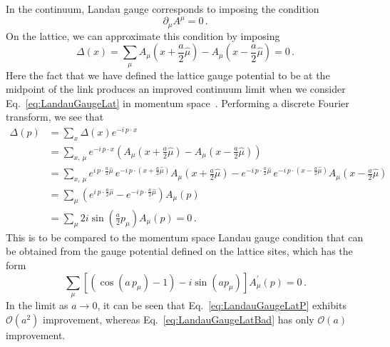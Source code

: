 In the continuum, Landau gauge corresponds to imposing the condition
\begin{equation}
\partial_\mu A^\mu = 0\, .
\label{eq:LandauGaugeCont}
\end{equation}
%
On the lattice, we can approximate this condition by imposing
\begin{equation}
\Delta(x) = \sum _ { \mu } A _ { \mu } \left( x + \frac{a}{2}\hat { \mu } \right) - A _ { \mu } \left( x-\frac{a}{2}\hat { \mu } \right) = 0\, .
\label{eq:LandauGaugeLat}
\end{equation}
Here the fact that we have defined the lattice gauge potential to be at the midpoint of the link produces an improved continuum limit when we consider Eq.~\ref{eq:LandauGaugeLat} in momentum space~\cite{Alles:1996ka}. Performing a discrete Fourier transform, we see that
%
\begin{align}
\Delta(p) &= \sum_x \Delta(x) e^{-i\,p\cdot x} \nonumber\\
&=\sum_{x,\,\mu} e^{-i\,p\cdot x} \left(A _ { \mu } \left( x + \frac{a}{2}\hat { \mu } \right) - A _ { \mu } \left( x-\frac{a}{2}\hat { \mu } \right)\right) \nonumber\\
&= \sum_{x,\,\mu} e^{i\,p\cdot\frac{a}{2}\hat{\mu} }\,e^{-i\,p\cdot\left(x+\frac{a}{2}\hat{\mu} \right)}A _ { \mu } \left( x + \frac{a}{2}\hat { \mu } \right) - e^{-i\,p\cdot\frac{a}{2}\hat{\mu} }\,e^{-i\,p\cdot\left(x-\frac{a}{2}\hat{\mu} \right)}A _ { \mu } \left( x - \frac{a}{2}\hat { \mu } \right) \nonumber\\
&= \sum_\mu \left(e^{i\,p\cdot\frac{a}{2}\hat{\mu} } - e^{-i\,p\cdot\frac{a}{2}\hat{\mu} }\right) A_\mu(p) \nonumber\\
&=\sum_\mu 2i\sin\left(\frac{a}{2} p_\mu\right)A_\mu(p) = 0\, .
\label{eq:LandauGaugeLatP}
\end{align}
%
This is to be compared to the momentum space Landau gauge condition that can be obtained from the gauge potential defined on the lattice sites, which has the form~\cite{Alles:1996ka}
%
\begin{equation}
\sum _ { \mu } \left[ \left( \cos (a\,p _ { \mu }) - 1 \right) - i \sin (ap _ { \mu }) \right] A _ { \mu } ^ { \prime } ( p ) = 0\, .
\label{eq:LandauGaugeLatBad}
\end{equation}
%
In the limit as $a\rightarrow 0$, it can be seen that Eq.~\ref{eq:LandauGaugeLatP} exhibits
$\mathcal{O}(a^2)$ improvement, whereas Eq.~\ref{eq:LandauGaugeLatBad} has only $\mathcal{O}(a)$ improvement.\\

